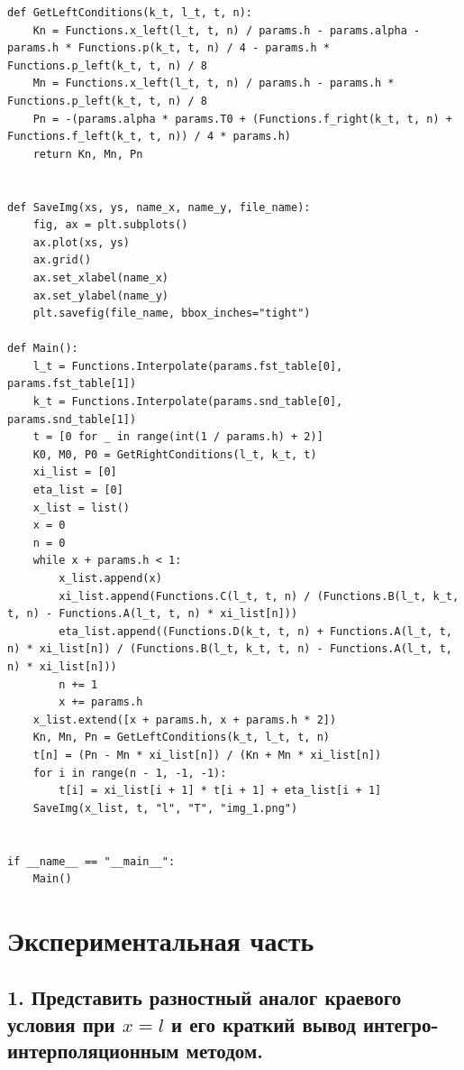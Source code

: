 \documentclass[a4paper,oneside,12pt]{extreport}
\begin{document}
\begin{lstlisting}[]
def GetLeftConditions(k_t, l_t, t, n):
	Kn = Functions.x_left(l_t, t, n) / params.h - params.alpha - params.h * Functions.p(k_t, t, n) / 4 - params.h * Functions.p_left(k_t, t, n) / 8
	Mn = Functions.x_left(l_t, t, n) / params.h - params.h * Functions.p_left(k_t, t, n) / 8
	Pn = -(params.alpha * params.T0 + (Functions.f_right(k_t, t, n) + Functions.f_left(k_t, t, n)) / 4 * params.h)
	return Kn, Mn, Pn


def SaveImg(xs, ys, name_x, name_y, file_name):
	fig, ax = plt.subplots()
	ax.plot(xs, ys)
	ax.grid()
	ax.set_xlabel(name_x)
	ax.set_ylabel(name_y)
	plt.savefig(file_name, bbox_inches="tight")

def Main():
	l_t = Functions.Interpolate(params.fst_table[0], params.fst_table[1])
	k_t = Functions.Interpolate(params.snd_table[0], params.snd_table[1])
	t = [0 for _ in range(int(1 / params.h) + 2)]
	K0, M0, P0 = GetRightConditions(l_t, k_t, t)
	xi_list = [0]
	eta_list = [0]
	x_list = list()
	x = 0
	n = 0
	while x + params.h < 1:
		x_list.append(x)
		xi_list.append(Functions.C(l_t, t, n) / (Functions.B(l_t, k_t, t, n) - Functions.A(l_t, t, n) * xi_list[n]))
		eta_list.append((Functions.D(k_t, t, n) + Functions.A(l_t, t, n) * xi_list[n]) / (Functions.B(l_t, k_t, t, n) - Functions.A(l_t, t, n) * xi_list[n]))
		n += 1
		x += params.h
	x_list.extend([x + params.h, x + params.h * 2])
	Kn, Mn, Pn = GetLeftConditions(k_t, l_t, t, n)
	t[n] = (Pn - Mn * xi_list[n]) / (Kn + Mn * xi_list[n])
	for i in range(n - 1, -1, -1):
		t[i] = xi_list[i + 1] * t[i + 1] + eta_list[i + 1]
	SaveImg(x_list, t, "l", "T", "img_1.png")


if __name__ == "__main__":
	Main()
\end{lstlisting}

\newpage 

\section{Экспериментальная часть}

\subsection{1. Представить разностный аналог краевого условия при $x = l$ и его краткий вывод интегро-интерполяционным методом.}
\end{document}
